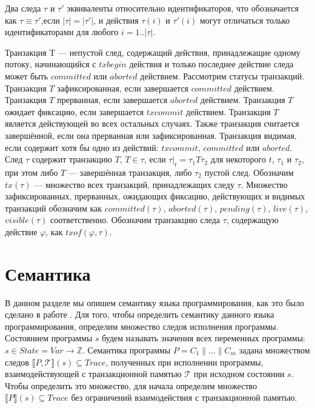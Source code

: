 \begin{mydefinition}\label{def3} Два следа $\tau$ и $\tau'$ эквиваленты относительно идентификаторов, что обозначается как $\tau \equiv \tau'$,если $|\tau| = |\tau'|$, и действия $\tau(i)$ и $\tau'(i)$ могут отличаться только идентификаторами для любого $i = 1..|\tau|$.
\end{mydefinition}

Транзакция T --- непустой след, содержащий действия, принадлежащие одному потоку, начинающийся с $txbegin$ действия и только последнее действие следа может быть $committed$ или $aborted$ действием. Рассмотрим статусы транзакций. Транзакция $T$ зафиксированная, если завершается $committed$ действием. Транзакция $T$ прерванная, если завершается $aborted$ действием. Транзакция $T$ ожидает фиксацию, если завершается $txcommit$ действием. Транзакция $T$ является действующей во всех остальных случаях. Также транзакция считается завершённой, если она прерванная или зафиксированная. Транзакция видимая, если содержит хотя бы одно из действий: $txcommit$, $committed$ или $aborted$. След $\tau$ содержит транзакцию $T$, $T \in \tau$, если $\tau|_t = \tau_1T\tau_2$ для некоторого $t$, $\tau_1$ и $\tau_2$, при этом либо $T$ --- завершённая транзакция, либо $\tau_2$ пустой след. Обозначим $tx(\tau)$ --- множество всех транзакций, принадлежащих следу $\tau$. Множество зафиксированных, прерванных, ожидающих фиксацию, действующих и видимых транзакций обозначим как $committed(\tau)$, $aborted(\tau)$, $pending(\tau)$, $live(\tau)$, $visible(\tau)$ соответственно. Обозначим транзакцию следа $\tau$, содержащую действие $\varphi$, как $txof(\varphi, \tau)$.

\section{Семантика}
В данном разделе мы опишем семантику языка программирования, как это было сделано в работе \cite{tms_article}. Для того, чтобы определить семантику данного языка программирования, определим множество следов исполнения программы. Состоянием программы $s$ будем называть значения всех переменных программы: $s \in State = Var \to \mathbb{Z} $. Семантика программы $P = C_1 \parallel \ldots \parallel C_m$ задана множеством следов $\llbracket P, \mathcal{T} \rrbracket (s) \subseteq Trace$, полученных при исполнении программы, взаимодействующей с транзакционной памятью $\mathcal{T}$ при исходном состоянии $s$. Чтобы определить это множество, для начала определим множество $\llbracket P \rrbracket (s) \subseteq Trace$ без ограничений взаимодействия с транзакционной памятью.

